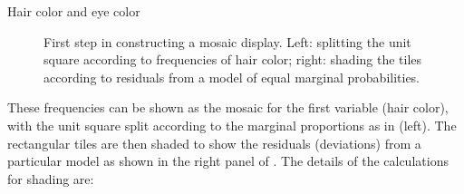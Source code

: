 \documentclass[10pt,krantz2]{krantz}\usepackage[]{graphicx}\usepackage[]{color}
\newenvironment{knitrout}{}{} %
\renewenvironment{knitrout}{\small\renewcommand{\baselinestretch}{.85}}{} %
\begin{document}
\begin{Example}[haireye2a]{Hair color and eye color}
\begin{knitrout}
\begin{figure}[!htbp]
\caption[First step in constructing a mosaic display]{First step in constructing a mosaic display. Left: splitting the unit square according to frequencies of hair color; right: shading the tiles according to residuals from a model of equal marginal probabilities.}\label{fig:haireye-mos4}
\end{figure}


\end{knitrout}

These frequencies can be shown as the mosaic for the first variable (hair color),
with the unit square split according to the marginal proportions
as in  (left).
The rectangular tiles are then shaded to show the residuals (deviations)
from a particular model as shown in the right panel of .
The details of the calculations for shading are:


\end{Example}
\end{document}
